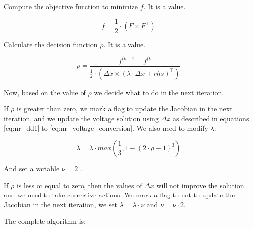 \documentclass[a4paper,twoside,fleqn]{tufte-book}
\begin{document}
Compute the objective function to minimize $f$. It is a value.

\begin{equation}
f = \frac{1}{2} \cdot (F \times F^\top)
\label{eq:lm_f}
\end{equation}

Calculate the decision function $\rho$. It is a value.


\begin{equation}
\rho = \frac{f^{(k-1}-f^{(k}}{\frac{1}{2} \cdot (\Delta x \times (\lambda \cdot \Delta x + rhs)^\top)}
\label{eq:lm_rho}
\end{equation}

Now, based on the value of $\rho$ we decide what to do in the next iteration.

If $\rho$ is greater than zero, we mark a flag to update the Jacobian in the next iteration, and we update the voltage solution using $\Delta x$ as described in equations  \ref{eq:nr_dd1} to \ref{eq:nr_voltage_conversion}. We also need to modify $\lambda$:


\begin{equation}
\lambda = \lambda \cdot max(\frac{1}{3}, 1-(2\cdot \rho -1)^3)
\label{eq:lm_update_l}
\end{equation}

And set a variable $\nu=2$ .


If $\rho$ is less or equal to zero, then the values of $\Delta x$ will not improve the solution and we need to take corrective actions. We mark a flag to not to update the Jacobian in the next iteration, we set $\lambda=\lambda \cdot \nu$ and $\nu = \nu \cdot 2$.


The complete algorithm is: 
\end{document}
